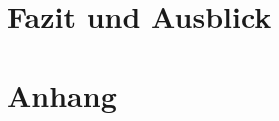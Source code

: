 \documentclass[ngerman]{scrartcl} %
\begin{document}
\section{Fazit und Ausblick}        
\label{sec:Fazit und Ausblick-1}  


\newpage
{}
  


\appendix


\section*{Anhang}   
\label{sec:Anhang-1}  

\end{document}
